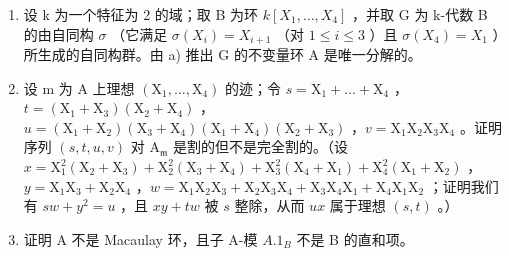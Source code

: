 \begin{enumerate}
\def\labelenumi{\alph{enumi})}
\setcounter{enumi}{1}
\item
  设 k 为一个特征为 2 的域；取 B 为环 \(k[X_{1},\ldots,X_{4}]\) ，并取 G 为 k-代数 B 的由自同构 \(\sigma\) （它满足 \(\sigma(X_{i})=X_{i+1}\) （对 \(1\leqslant i\leqslant3\) ）且 \(\sigma(X_{4})=X_{1}\) ）所生成的自同构群。由 a) 推出 G 的不变量环 A 是唯一分解的。
\item
  设 m 为 \(\mathrm{A}\) 上理想 \((\mathrm{X}_1, \ldots, \mathrm{X}_4)\) 的迹；令 \(s = \mathrm{X}_1 + \ldots + \mathrm{X}_4\) ，\(t = (\mathrm{X}_1 + \mathrm{X}_3)(\mathrm{X}_2 + \mathrm{X}_4)\) ，\(u = (\mathrm{X}_1 + \mathrm{X}_2)(\mathrm{X}_3 + \mathrm{X}_4)(\mathrm{X}_1 + \mathrm{X}_4)(\mathrm{X}_2 + \mathrm{X}_3)\) ，\(v = \mathrm{X}_1\mathrm{X}_2\mathrm{X}_3\mathrm{X}_4\) 。证明序列 \((s, t, u, v)\) 对 \(\mathrm{A}_{\mathfrak{m}}\) 是割的但不是完全割的。（设 \(x = \mathrm{X}_1^2(\mathrm{X}_2 + \mathrm{X}_3) + \mathrm{X}_2^2(\mathrm{X}_3 + \mathrm{X}_4) + \mathrm{X}_3^2(\mathrm{X}_4 + \mathrm{X}_1) + \mathrm{X}_4^2(\mathrm{X}_1 + \mathrm{X}_2)\) ，\(y = \mathrm{X}_1\mathrm{X}_3 + \mathrm{X}_2\mathrm{X}_4\) ，\(w = \mathrm{X}_1\mathrm{X}_2\mathrm{X}_3 + \mathrm{X}_2\mathrm{X}_3\mathrm{X}_4 + \mathrm{X}_3\mathrm{X}_4\mathrm{X}_1 + \mathrm{X}_4\mathrm{X}_1\mathrm{X}_2\) ；证明我们有 \(sw + y^2 = u\) ，且 \(xy + tw\) 被 \(s\) 整除，从而 \(ux\) 属于理想 \((s, t)\) 。）
\item
  证明 A 不是 Macaulay 环，且子 A-模 \(A.1_{B}\) 不是 B 的直和项。
\end{enumerate}

